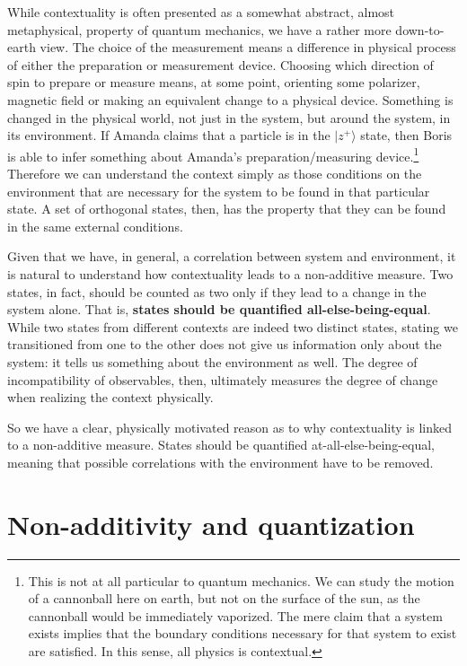 \documentclass[10pt,twocolumn, nofootinbib]{revtex4-2}
\def\>{\rangle}
\begin{document}
While contextuality is often presented as a somewhat abstract, almost metaphysical, property of quantum mechanics, we have a rather more down-to-earth view. The choice of the measurement means a difference in physical process of either the preparation or measurement device. Choosing which direction of spin to prepare or measure means, at some point, orienting some polarizer, magnetic field or making an equivalent change to a physical device. Something is changed in the physical world, not just in the system, but around the system, in its environment. If Amanda claims that a particle is in the $|z^+\>$ state, then Boris is able to infer something about Amanda's preparation/measuring device.\footnote{This is not at all particular to quantum mechanics. We can study the motion of a cannonball here on earth, but not on the surface of the sun, as the cannonball would be immediately vaporized. The mere claim that a system exists implies that the boundary conditions necessary for that system to exist are satisfied. In this sense, all physics is contextual.} Therefore we can understand the context simply as those conditions on the environment that are necessary for the system to be found in that particular state. A set of orthogonal states, then, has the property that they can be found in the same external conditions.

Given that we have, in general, a correlation between system and environment, it is natural to understand how contextuality leads to a non-additive measure. Two states, in fact, should be counted as two only if they lead to a change in the system alone. That is, \textbf{states should be quantified all-else-being-equal}. While two states from different contexts are indeed two distinct states, stating we transitioned from one to the other does not give us information only about the system: it tells us something about the environment as well. The degree of incompatibility of observables, then, ultimately measures the degree of change when realizing the context physically.

So we have a clear, physically motivated reason as to why contextuality is linked to a non-additive measure. States should be quantified at-all-else-being-equal, meaning that possible correlations with the environment have to be removed.

\section{Non-additivity and quantization}
\end{document}
